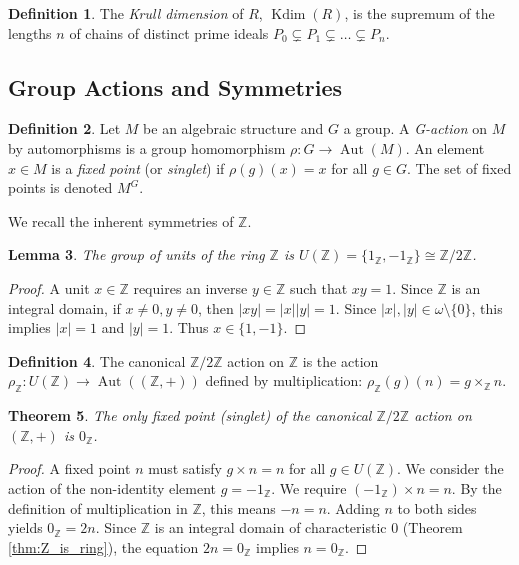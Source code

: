 \documentclass[11pt, a4paper]{article}
\theoremstyle{plain}
\newtheorem{theorem}{Theorem}[section]
\newtheorem{lemma}[theorem]{Lemma}
\theoremstyle{definition}
\newtheorem{definition}[theorem]{Definition}
\numberwithin{equation}{section}
\newcommand{\Z}{\mathbb{Z}}
\newcommand{\Ztwo}{\mathbb{Z}/2\mathbb{Z}}
\DeclareMathOperator{\Aut}{Aut}
\DeclareMathOperator{\KrullDim}{Kdim}
\begin{document}
\begin{definition}\label{def:Krull_dimension}
The \emph{Krull dimension} of $R$, $\KrullDim(R)$, is the supremum of the lengths $n$ of chains of distinct prime ideals $P_0 \subsetneq P_1 \subsetneq \dots \subsetneq P_n$.
\end{definition}

\subsection{Group Actions and Symmetries}

\begin{definition}\label{def:G_action}
Let $M$ be an algebraic structure and $G$ a group. A \emph{G-action} on $M$ by automorphisms is a group homomorphism $\rho: G \to \Aut(M)$. An element $x \in M$ is a \emph{fixed point} (or \emph{singlet}) if $\rho(g)(x) = x$ for all $g \in G$. The set of fixed points is denoted $M^G$.
\end{definition}

We recall the inherent symmetries of $\Z$.

\begin{lemma}\label{lem:units_Z}
The group of units of the ring $\Z$ is $U(\Z) = \{1_{\Z}, -1_{\Z}\} \cong \Ztwo$.
\end{lemma}
\begin{proof}
A unit $x \in \Z$ requires an inverse $y \in \Z$ such that $xy=1$. Since $\Z$ is an integral domain, if $x\neq 0, y\neq 0$, then $|xy|=|x||y|=1$. Since $|x|, |y| \in \omega\setminus\{0\}$, this implies $|x|=1$ and $|y|=1$. Thus $x \in \{1, -1\}$.
\end{proof}

\begin{definition}\label{def:Z_action_on_Z}
The canonical $\Ztwo$ action on $\Z$ is the action $\rho_{\Z}: U(\Z) \to \Aut((\Z, +))$ defined by multiplication: $\rho_{\Z}(g)(n) = g \times_{\Z} n$.
\end{definition}

\begin{theorem}\label{thm:Z_singlets}
The only fixed point (singlet) of the canonical $\Ztwo$ action on $(\Z, +)$ is $0_{\Z}$.
\end{theorem}
\begin{proof}
A fixed point $n$ must satisfy $g\times n = n$ for all $g \in U(\Z)$. We consider the action of the non-identity element $g=-1_{\Z}$. We require $(-1_{\Z})\times n = n$. By the definition of multiplication in $\Z$, this means $-n=n$. Adding $n$ to both sides yields $0_{\Z}=2n$. Since $\Z$ is an integral domain of characteristic 0 (Theorem \ref{thm:Z_is_ring}), the equation $2n=0_{\Z}$ implies $n=0_{\Z}$.
\end{proof}
\end{document}
